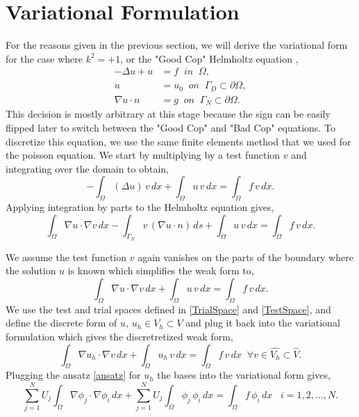 \section{Variational Formulation}
For the reasons given in the previous section, we will derive the variational form for the case where $k^2=+1$, or the "Good Cop" Helmholtz equation \cite{Farrell2018},
\begin{align}
-\Delta u + u &= f \;\; in \;\; \Omega, \\
u &= u_0 \;\; on \;\; \Gamma_D \subset \partial \Omega, \\
\nabla u\cdot n &= g \;\; on \;\; \Gamma_N \subset \partial \Omega.
\label{pde}
\end{align}
This decision is mostly arbitrary at this stage because the sign can be easily flipped later to switch between the "Good Cop" and "Bad Cop" equations.  To discretize this equation, we use the same finite elements method that we used for the poisson equation. We start by multiplying by a test function $v$ and integrating over the domain to obtain,
\begin{equation}
-\int_{\Omega} (\Delta u) \, v \, dx + \int_{\Omega} u \, v \, dx = \int_{\Omega} f \, v \, dx.
\end{equation}
Applying integration by parts to the Helmholtz equation gives,
\begin{equation}
\int_{\Omega} \nabla u \cdot \nabla v \, dx - \int_{\Gamma_N} v \, (\nabla u \cdot n) \, ds + \int_{\Omega} u \, v \, dx = \int_{\Omega} f \, v \, dx.
\end{equation}

We assume the test function $v$ again vanishes on the parts of the boundary where the solution $u$ is known which simplifies the weak form to,
\begin{equation}
\int_{\Omega} \nabla u \cdot \nabla v \, dx + \int_{\Omega} u \, v \, dx = \int_{\Omega} f \, v \, dx.
\end{equation}
We use the test and trial spaces defined in \eqref{TrialSpace} and \eqref{TestSpace}, and define the discrete form of $u$, $u_h \in V_h \subset V$ and plug it back into the variational formulation which gives the discretretized weak form,
\begin{equation}
\int_{\Omega} \nabla u_h \cdot \nabla v \, dx + \int_{\Omega} u_h \, v \, dx = \int_{\Omega} f \, v \, dx \;\; \forall v \in \hat{V_h} \subset \hat{V}.
\end{equation}
Plugging the ansatz \eqref{ansatz} for $u_h$ the bases into the variational form gives,
\begin{equation}
\sum^N_{j=1} U_j \int_{\Omega} \nabla \phi_j \cdot \nabla \phi_i \, dx + \sum^N_{j=1} U_j \int_{\Omega} \phi_j \, \phi_i \, dx = \int_{\Omega} f \, \phi_i \, dx \;\;\; i = 1,2,...,N.
\end{equation}

